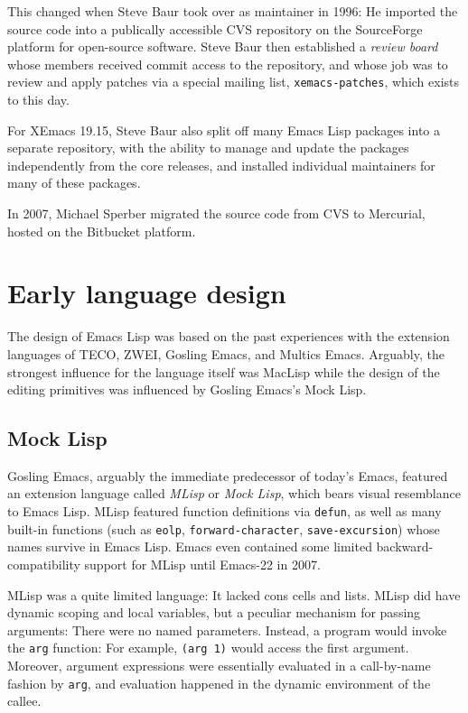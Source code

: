 \documentclass[format=acmsmall, review]{acmart}
\newcommand \Elisp {Emacs Lisp}
\begin{document}
This changed when Steve Baur took over as maintainer in 1996: He
imported the source code into a publically accessible CVS repository on
the SourceForge platform for open-source software.  Steve Baur then
established a \textit{review board} whose members received commit
access to the repository, and whose job was to review and apply
patches via a special mailing list, \texttt{xemacs-patches}, which
exists to this day.

For XEmacs 19.15, Steve Baur also split off many \Elisp{} packages
into a separate repository, with the ability to manage and update the
packages independently from the core releases, and installed
individual maintainers for many of these packages.

In 2007, Michael Sperber migrated the source code from CVS to
Mercurial, hosted on the Bitbucket platform.

\section{Early language design}         %
\label{sec:early-history}

The design of \Elisp{} was based on the past experiences with the extension
languages of TECO, ZWEI, Gosling Emacs, and Multics Emacs.
Arguably, the strongest influence for the language itself was MacLisp while
the design of the editing primitives was influenced by Gosling Emacs's
Mock Lisp.

\subsection{Mock Lisp}
\label{sec:mock-lisp}

Gosling Emacs, arguably the immediate predecessor of today's Emacs,
featured an extension language called \emph{MLisp} or \emph{Mock Lisp},
which bears visual resemblance to \Elisp{}.  MLisp featured function
definitions via \texttt{defun}, as well as many built-in functions (such as
\texttt{eolp}, \texttt{forward-character}, \texttt{save-excursion}) whose
names survive in \Elisp{}.  Emacs even contained some limited
back\-ward-compatibility support for MLisp until Emacs-22 in 2007.

MLisp was a quite limited language: It lacked cons cells and lists.
MLisp did have dynamic scoping and local variables, but a peculiar
mechanism for passing arguments:  There were no named
parameters.  Instead, a program would invoke the \texttt{arg}
function: For example, \texttt{(arg 1)} would access the first
argument.  Moreover, argument expressions were essentially evaluated
in a call-by-name fashion by \texttt{arg}, and evaluation happened in
the dynamic environment of the callee.
\end{document}
